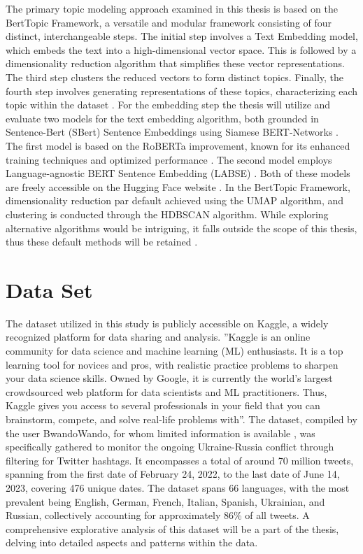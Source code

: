 \documentclass[
    11pt,
    a4paper,
    egregdoesnotlikesansseriftitles,
    toc=chapterentrywithdots,
    oneside,openright,
    titlepage,
    parskip=half,
    headings=normal,  %
    listof=totoc,
    bibliography=totoc,
    index=totoc,
    captions=tableheading,  %
    chapterprefix,
    listof=flat,
    final
]{scrbook}
\begin{document}
The primary topic modeling approach examined in this thesis is based on the BertTopic Framework, a versatile and modular framework consisting of four distinct, interchangeable steps. The initial step involves a Text Embedding model, which embeds the text into a high-dimensional vector space. This is followed by a dimensionality reduction algorithm that simplifies these vector representations. The third step clusters the reduced vectors to form distinct topics. Finally, the fourth step involves generating representations of these topics, characterizing each topic within the dataset \cite{BERTopic}.
For the embedding step the thesis will utilize and evaluate two models for the text embedding algorithm, both grounded in Sentence-Bert (SBert) Sentence Embeddings using Siamese BERT-Networks \cite{SentenceBERT}. The first model is based on the RoBERTa improvement, known for its enhanced training techniques and optimized performance \cite{RoBERTa}. The second model employs Language-agnostic BERT Sentence Embedding (LABSE) \cite{Labse}. Both of these models are freely accessible on the Hugging Face website \cite{HuggingFace}.
In the BertTopic Framework, dimensionality reduction par default achieved using the UMAP algorithm, and clustering is conducted through the HDBSCAN algorithm. While exploring alternative algorithms would be intriguing, it falls outside the scope of this thesis, thus these default methods will be retained \cite{UMAP,HDBSCAN}.

{\let\clearpage\relax \chapter{Data Set}}
The dataset utilized in this study is publicly accessible on Kaggle, a widely recognized platform for data sharing and analysis. ''Kaggle is an online community for data science and machine learning (ML) enthusiasts. It is a top learning tool for novices and pros, with realistic practice problems to sharpen your data science skills.
Owned by Google, it is currently the world’s largest crowdsourced web platform for data scientists and ML practitioners. Thus, Kaggle gives you access to several professionals in your field that you can brainstorm, compete, and solve real-life problems with''\cite{Kaggle}.
The dataset, compiled by the user BwandoWando, for whom limited information is available \cite{bwandowando}, was specifically gathered to monitor the ongoing Ukraine-Russia conflict through filtering for Twitter hashtags.
It encompasses a total of around 70 million tweets, spanning from the first date of February 24, 2022, to the last date of June 14, 2023, covering 476 unique dates. The dataset spans 66 languages, with the most prevalent being English, German, French, Italian, Spanish, Ukrainian, and Russian, collectively accounting for approximately 86\% of all tweets. A comprehensive explorative analysis of this dataset will be a part of the thesis, delving into detailed aspects and patterns within the data.
\end{document}

